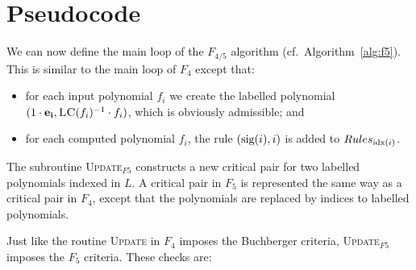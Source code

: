 \section{Pseudocode}

We can now define the main loop of the $F_{4/5}$ algorithm (cf.~Algorithm~\ref{alg:f5}). This is similar to the main loop of $F_4$ except that:
\begin{itemize}
 \item for each input polynomial $f_i$ we create the labelled polynomial $(1\cdot\mathbf{e_i},\textsc{LC}(f_i)^{-1}\cdot f_i)$, which is obviously admissible; and
 \item for each computed polynomial $f_i$, the rule $(\textnormal{sig}(i),i)$ is added to $Rules_{\textnormal{idx}(i)}$.
\end{itemize}

\begin{algorithm}
\caption{$F_{4/5}$} 
\label{alg:f5}
\end{algorithm}

The subroutine \textsc{Update}$_{F5}$ constructs a new critical pair for two labelled polynomials indexed in $L$. A critical pair in $F_5$ is represented the same way as a critical pair in $F_4$, except that the polynomials are replaced by indices to labelled polynomials.

Just like the routine \textsc{Update} in $F_4$ imposes the Buchberger criteria, \textsc{Update}$_{F5}$ imposes the $F_5$ criteria. These checks are:

